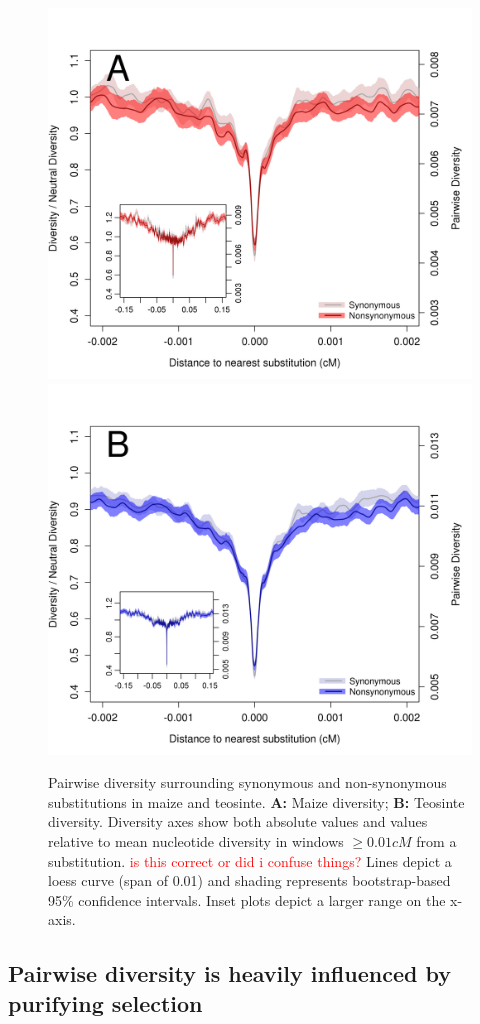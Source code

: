 \documentclass{pnastwo}
\newcommand{\jri}[1]{\textcolor{red}{\scriptsize #1}}
\begin{document}
\begin{article}
\begin{figure}[!htb]
\centering
\includegraphics[width=.45\textwidth]{FigsAndFiles/plotDiversity_TvM_Folded2_Significance_Aug}
\hspace{0.05\textwidth} \includegraphics[width=.45\textwidth]{FigsAndFiles/plotDiversity_TvT_Folded2_Significance_Aug}
\caption{Pairwise diversity surrounding synonymous and non-synonymous
  substitutions in maize and teosinte. {\bf A:} Maize diversity; {\bf B:} Teosinte diversity. Diversity axes show both absolute values and values relative to mean nucleotide diversity in windows $\geq 0.01 cM$ from a substitution. \jri{is this correct or did i confuse things?}
 Lines depict a loess curve (span of 0.01)  and shading represents bootstrap-based 95\% confidence intervals. Inset plots depict a larger range on the x-axis. \label{fig:hardSweeps}}
\end{figure}


\subsection{Pairwise diversity is heavily influenced by purifying selection}


\end{article}
\end{document}
